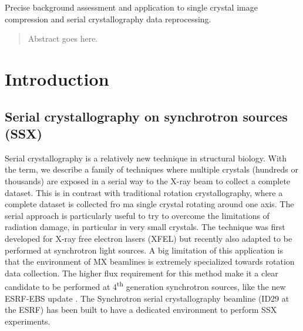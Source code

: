 \documentclass[preprint]{iucr}              %
\begin{document}

\maketitle                        %

\begin{synopsis}
Precise background assessment and application to single crystal image compression and serial crystallography data reprocessing. 
\end{synopsis}

\begin{abstract}
Abstract goes here.
\end{abstract}



\section{Introduction}
\subsection{Serial crystallography on synchrotron sources (SSX)}
Serial crystallography is a relatively new technique in structural biology. 
With the term, we describe a family of techniques where multiple crystals (hundreds or thousands) are exposed in a serial way to the X-ray beam to collect a complete dataset. 
This is in contrast with traditional rotation crystallography, where a complete dataset is collected fro ma single crystal rotating around one axis. 
The serial approach is particularly useful to try to overcome the limitations of radiation damage, in particular in very small crystals.
The technique was first developed for X-ray free electron lasers (XFEL) \cite{Chapman2011}
but recently also adapted to be performed at synchrotron light sources.
A big limitation of this application is that the environment of MX beamlines is extremely specialized towards rotation data collection. %
The higher flux requirement for this method make it a clear candidate to be performed at 4\textsuperscript{th} generation synchrotron sources, like the new ESRF-EBS update \cite{EBS}.
The Synchrotron serial crystallography beamline (ID29 at the ESRF) has been built to have a dedicated environment to perform SSX experiments.
\end{document}
